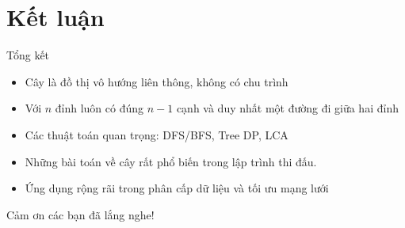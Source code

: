 \documentclass[aspectratio=169]{beamer}
\begin{document}
\section{Kết luận}

\begin{frame}{Tổng kết}

\begin{itemize}
    \item Cây là đồ thị vô hướng liên thông, không có chu trình
    \item Với $n$ đỉnh luôn có đúng $n-1$ cạnh và duy nhất một đường đi giữa hai đỉnh
    \item Các thuật toán quan trọng: DFS/BFS, Tree DP, LCA
    \item Những bài toán về cây rất phổ biến trong lập trình thi đấu.
    \item Ứng dụng rộng rãi trong phân cấp dữ liệu và tối ưu mạng lưới
\end{itemize}

\end{frame}

\begin{frame}

\centering
\Huge
Cảm ơn các bạn đã lắng nghe!

\end{frame}
\end{document}
